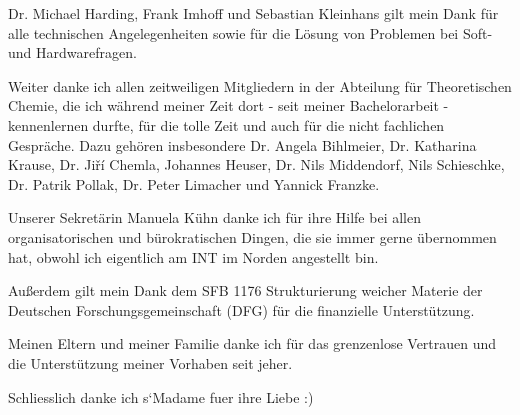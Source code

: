 Dr. Michael Harding, Frank Imhoff und Sebastian Kleinhans gilt mein Dank für alle technischen Angelegenheiten sowie für die Lösung von Problemen bei Soft- und Hardwarefragen. 

Weiter danke ich allen zeitweiligen Mitgliedern in der Abteilung für Theoretischen Chemie, die ich während meiner Zeit dort - seit meiner Bachelorarbeit - kennenlernen durfte, für die tolle Zeit und auch für die nicht fachlichen Gespräche. Dazu gehören insbesondere Dr. Angela Bihlmeier, Dr. Katharina Krause, Dr. Jiří Chemla, Johannes Heuser, Dr. Nils  Middendorf, Nils Schieschke, Dr. Patrik Pollak, Dr. Peter Limacher und Yannick Franzke.

Unserer Sekretärin Manuela Kühn danke ich für ihre Hilfe bei allen organisatorischen und bürokratischen Dingen, die sie immer gerne übernommen hat, obwohl ich eigentlich am INT im Norden angestellt bin.

\bigskip
Außerdem gilt mein Dank dem SFB 1176 \glqq Strukturierung weicher Materie\grqq{} der Deutschen Forschungsgemeinschaft (DFG) für die finanzielle Unterstützung.

\bigskip
Meinen Eltern und meiner Familie danke ich für das grenzenlose Vertrauen und die Unterstützung meiner Vorhaben seit jeher. 

Schliesslich danke ich s`Madame fuer ihre Liebe :)
